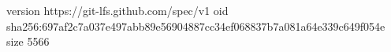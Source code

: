 version https://git-lfs.github.com/spec/v1
oid sha256:697af2c7a037e497abb89e56904887cc34ef068837b7a081a64e339c649f054e
size 5566
